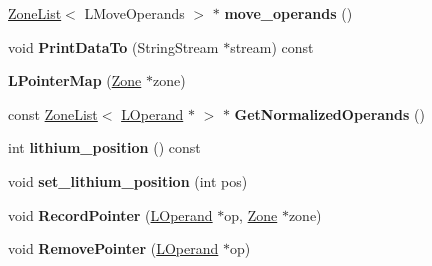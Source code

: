 \begin{DoxyCompactItemize}
\item 
\hypertarget{classv8_1_1internal_1_1_v8___f_i_n_a_l_a9c7ac28c4100d52001effdc06dbff7f6}{}\hyperlink{classv8_1_1internal_1_1_zone_list}{Zone\+List}$<$ L\+Move\+Operands $>$ $\ast$ {\bfseries move\+\_\+operands} ()\label{classv8_1_1internal_1_1_v8___f_i_n_a_l_a9c7ac28c4100d52001effdc06dbff7f6}

\item 
\hypertarget{classv8_1_1internal_1_1_v8___f_i_n_a_l_a177854eb82d2354acf1f5004e42ad10f}{}void {\bfseries Print\+Data\+To} (String\+Stream $\ast$stream) const \label{classv8_1_1internal_1_1_v8___f_i_n_a_l_a177854eb82d2354acf1f5004e42ad10f}

\item 
\hypertarget{classv8_1_1internal_1_1_v8___f_i_n_a_l_a31dfca2a44ff3611caaeed55354a1b16}{}{\bfseries L\+Pointer\+Map} (\hyperlink{classv8_1_1internal_1_1_zone}{Zone} $\ast$zone)\label{classv8_1_1internal_1_1_v8___f_i_n_a_l_a31dfca2a44ff3611caaeed55354a1b16}

\item 
\hypertarget{classv8_1_1internal_1_1_v8___f_i_n_a_l_a702c1c039c113568c89dd9af2add6620}{}const \hyperlink{classv8_1_1internal_1_1_zone_list}{Zone\+List}$<$ \hyperlink{classv8_1_1internal_1_1_l_operand}{L\+Operand} $\ast$ $>$ $\ast$ {\bfseries Get\+Normalized\+Operands} ()\label{classv8_1_1internal_1_1_v8___f_i_n_a_l_a702c1c039c113568c89dd9af2add6620}

\item 
\hypertarget{classv8_1_1internal_1_1_v8___f_i_n_a_l_a6696365d42cbc1a8af6d49363646b724}{}int {\bfseries lithium\+\_\+position} () const \label{classv8_1_1internal_1_1_v8___f_i_n_a_l_a6696365d42cbc1a8af6d49363646b724}

\item 
\hypertarget{classv8_1_1internal_1_1_v8___f_i_n_a_l_ad0339288d564c2e4cfc6b1259b2a5066}{}void {\bfseries set\+\_\+lithium\+\_\+position} (int pos)\label{classv8_1_1internal_1_1_v8___f_i_n_a_l_ad0339288d564c2e4cfc6b1259b2a5066}

\item 
\hypertarget{classv8_1_1internal_1_1_v8___f_i_n_a_l_a25dc8da4fb444fc6690d6d00b22e861f}{}void {\bfseries Record\+Pointer} (\hyperlink{classv8_1_1internal_1_1_l_operand}{L\+Operand} $\ast$op, \hyperlink{classv8_1_1internal_1_1_zone}{Zone} $\ast$zone)\label{classv8_1_1internal_1_1_v8___f_i_n_a_l_a25dc8da4fb444fc6690d6d00b22e861f}

\item 
\hypertarget{classv8_1_1internal_1_1_v8___f_i_n_a_l_a61bcda51c2f9f849195681347a8ec872}{}void {\bfseries Remove\+Pointer} (\hyperlink{classv8_1_1internal_1_1_l_operand}{L\+Operand} $\ast$op)\label{classv8_1_1internal_1_1_v8___f_i_n_a_l_a61bcda51c2f9f849195681347a8ec872}


\end{DoxyCompactItemize}

